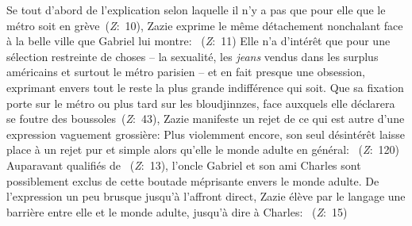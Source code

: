 Se  tout d'abord de l'explication selon laquelle il n'y a pas que pour elle que le métro soit en grève~(\textit{Z}:~10), Zazie exprime le même détachement nonchalant face à la belle ville que Gabriel lui montre: ~(\textit{Z}:~11)
Elle n'a d'intérêt que pour une sélection restreinte de choses -- la sexualité, les \textit{jeans} vendus dans les surplus américains et surtout le métro parisien -- et en fait presque une obsession, exprimant envers tout le reste la plus grande indifférence qui soit.
Que sa fixation porte sur le métro ou plus tard sur les bloudjinnzes, face auxquels elle déclarera se foutre des boussoles~(\textit{Z}:~43), Zazie manifeste un rejet de ce qui est autre d'une expression vaguement grossière: 
Plus violemment encore, son seul désintérêt laisse place à un rejet pur et simple alors qu'elle  le monde adulte en général: ~(\textit{Z}:~120)
Auparavant qualifiés de ~(\textit{Z}:~13), l'oncle Gabriel et son ami Charles sont possiblement exclus de cette boutade méprisante envers le monde adulte.
De l'expression un peu brusque jusqu'à l'affront direct, Zazie élève par le langage une barrière entre elle et le monde adulte, jusqu'à dire à Charles: ~(\textit{Z}:~15)

